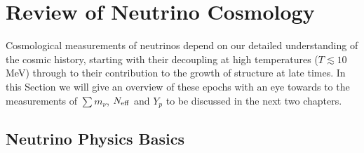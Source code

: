 \section{ Review of Neutrino Cosmology}\label{sec:neureview}

Cosmological measurements of neutrinos depend on our detailed understanding of the cosmic history, starting with their decoupling at high temperatures ($T \lesssim 10$ MeV) through to their contribution to the growth of structure at late times.  In this Section we will give an overview of these epochs with an eye towards to the measurements of $\sum m_\nu$, $N_{\rm eff}$ and $Y_p$ to be discussed in the next two chapters.  

\subsection{ Neutrino Physics Basics}

